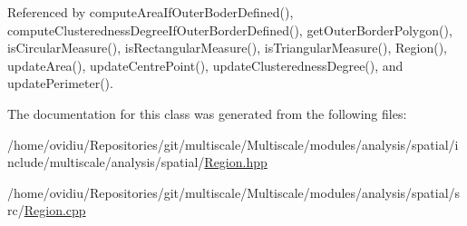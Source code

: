 Referenced by compute\-Area\-If\-Outer\-Boder\-Defined(), compute\-Clusteredness\-Degree\-If\-Outer\-Border\-Defined(), get\-Outer\-Border\-Polygon(), is\-Circular\-Measure(), is\-Rectangular\-Measure(), is\-Triangular\-Measure(), Region(), update\-Area(), update\-Centre\-Point(), update\-Clusteredness\-Degree(), and update\-Perimeter().



The documentation for this class was generated from the following files\-:\begin{DoxyCompactItemize}
\item 
/home/ovidiu/\-Repositories/git/multiscale/\-Multiscale/modules/analysis/spatial/include/multiscale/analysis/spatial/\hyperlink{analysis_2spatial_2include_2multiscale_2analysis_2spatial_2Region_8hpp}{Region.\-hpp}\item 
/home/ovidiu/\-Repositories/git/multiscale/\-Multiscale/modules/analysis/spatial/src/\hyperlink{Region_8cpp}{Region.\-cpp}\end{DoxyCompactItemize}
